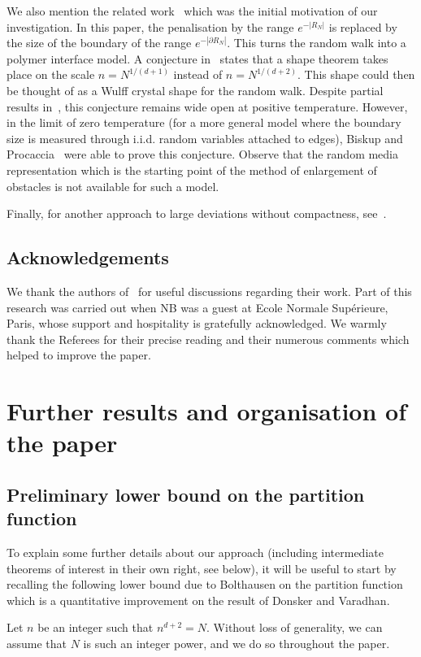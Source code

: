 \documentclass[AHL, Unicode, longabstracts, published]{cedram}
\begin{document}
We also mention the related work~\cite{BY} which was the initial motivation of our investigation. In this paper, the penalisation by the range $e^{ - |R_N|}$ is replaced by the size of the boundary of the range $e^{ - | \partial R_N|}$. This turns the random walk into a polymer interface model. A conjecture in~\cite{BY} states that a shape theorem takes place on the scale $n = N^{ 1/ (d+1)}$ instead of $n = N^{ 1/ (d+2)}$. This shape could then be thought of as a Wulff crystal shape for the random walk. Despite partial results in~\cite{BY}, this conjecture remains wide open at positive temperature. However, in the limit of zero temperature (for a more general model where the boundary size is measured through i.i.d. random variables attached to edges), Biskup and Procaccia~\cite{BP1, BP2} were able to prove this conjecture. Observe that the random media representation which is the starting point of the method of enlargement of obstacles is not available for such a model.


Finally, for another approach to large deviations without compactness, see~\cite{MV}.

\subsection*{Acknowledgements}
We thank the authors of~\cite{DFSX} for useful discussions regarding their work. Part of this research was carried out when NB was a guest at Ecole Normale Supérieure, Paris, whose support and hospitality is gratefully acknowledged.
We warmly thank the Referees for their precise reading and their numerous comments which helped to improve the paper.
\section{Further results and organisation of the paper}

\subsection{Preliminary lower bound on the partition function}

To explain some further details about our approach (including intermediate theorems of interest in their own right, see below), it will be useful to start by recalling the following lower bound due to Bolthausen on the partition function which is a quantitative improvement on the result of Donsker and Varadhan.

Let $n$ be an integer such that $n^{d+2}=N$. Without loss of generality, we can assume that $N$ is such an integer power, and we do so throughout the paper.
\end{document}
